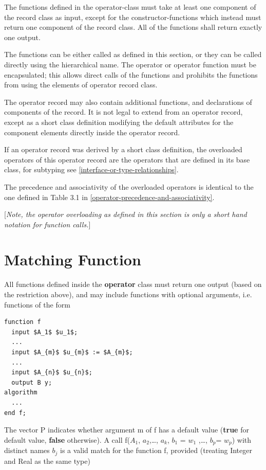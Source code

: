 \documentclass[10pt,a4paper]{report}
\def\doublelabel#1{\label{#1}\hypertarget{#1}{}}
\begin{document}
The functions defined in the operator-class must take at least one
component of the record class as input, except for the
constructor-functions which instead must return one component of the
record class. All of the functions shall return exactly one output.

The functions can be either called as defined in this section, or they
can be called directly using the hierarchical name. The operator or
operator function must be encapsulated; this allows direct calls of the
functions and prohibits the functions from using the elements of
operator record class.

The operator record may also contain additional functions, and
declarations of components of the record. It is not legal to extend from
an operator record, except as a short class definition modifying the
default attributes for the component elements directly inside the
operator record.

If an operator record was derived by a short class definition, the
overloaded operators of this operator record are the operators that are
defined in its base class, for subtyping see \ref{interface-or-type-relationships}.

The precedence and associativity of the overloaded operators is
identical to the one defined in Table 3.1 in \ref{operator-precedence-and-associativity}.

{[}\emph{Note, the operator overloading as defined in this section is
only a short hand notation for function calls.}{]}

\section{Matching Function}\doublelabel{matching-function}

All functions defined inside the \textbf{operator} class must return one
output (based on the restriction above), and may include functions with
optional arguments, i.e. functions of the form

\begin{lstlisting}[language=modelica,mathescape=true]
function f
  input $A_1$ $u_1$;
  ...
  input $A_{m}$ $u_{m}$ := $A_{m}$;
  ...
  input $A_{n}$ $u_{n}$;
  output B y;
algorithm
  ...
end f;
\end{lstlisting}
The vector P indicates whether argument m of f has a default value
(\textbf{true} for default value, \textbf{false} otherwise). A call
f($A_1$, $a_{2}$,\ldots{}, $a_{k}$,
$b_{1}$ = $w_{1}$ ,\ldots{}, $b_{p}$=
$w_{p}$) with distinct names $b_{j}$ is a valid
match for the function f, provided (treating Integer and Real as the
same type)
\end{document}
